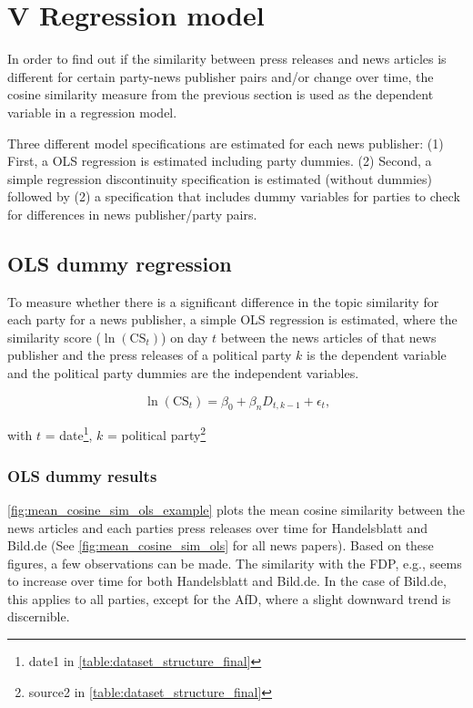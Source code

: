 \documentclass[
]{article}
\begin{document}
\hypertarget{v-regression-model}{%
\section{V Regression model}\label{v-regression-model}}

In order to find out if the similarity between press releases and news
articles is different for certain party-news publisher pairs and/or
change over time, the cosine similarity measure from the previous
section is used as the dependent variable in a regression model.

Three different model specifications are estimated for each news
publisher: (1) First, a OLS regression is estimated including party
dummies. (2) Second, a simple regression discontinuity specification is
estimated (without dummies) followed by (2) a specification that
includes dummy variables for parties to check for differences in news
publisher/party pairs.

\hypertarget{ols-dummy-regression}{%
\subsection{OLS dummy regression}\label{ols-dummy-regression}}

To measure whether there is a significant difference in the topic
similarity for each party for a news publisher, a simple OLS regression
is estimated, where the similarity score (\(\ln(\text{CS}_{t})\)) on day
\(t\) between the news articles of that news publisher and the press
releases of a political party \(k\) is the dependent variable and the
political party dummies are the independent variables.

\[
\ln(\text{CS}_{t})=\beta_0+\beta_nD_{t,k-1}+\epsilon_t\text{,}
\]

with \(t\) = date\footnote{date1 in
  \autoref{table:dataset_structure_final}}, \(k\) = political
party\footnote{source2 in \autoref{table:dataset_structure_final}}

\hypertarget{ols-dummy-results}{%
\subsubsection{OLS dummy results}\label{ols-dummy-results}}

\autoref{fig:mean_cosine_sim_ols_example} plots the mean cosine
similarity between the news articles and each parties press releases
over time for Handelsblatt and Bild.de (See
\autoref{fig:mean_cosine_sim_ols} for all news papers). Based on these
figures, a few observations can be made. The similarity with the FDP,
e.g., seems to increase over time for both Handelsblatt and Bild.de. In
the case of Bild.de, this applies to all parties, except for the AfD,
where a slight downward trend is discernible.
\end{document}

